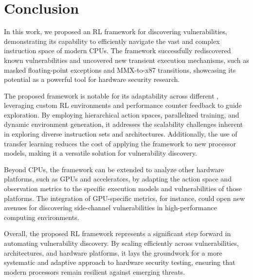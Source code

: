 \section{Conclusion}



In this work, we proposed an RL framework for discovering \Mi vulnerabilities, demonstrating its capability to efficiently navigate the vast and complex instruction space of modern CPUs. The framework successfully rediscovered known vulnerabilities and uncovered new transient execution mechanisms, such as masked floating-point exceptions and MMX-to-x87 transitions, showcasing its potential as a powerful tool for hardware security research.

The proposed framework is notable for its adaptability across different \Mi, leveraging custom RL environments and performance counter feedback to guide exploration. By employing hierarchical action spaces, parallelized training, and dynamic environment generation, it addresses the scalability challenges inherent in exploring diverse instruction sets and architectures. Additionally, the use of transfer learning reduces the cost of applying the framework to new processor models, making it a versatile solution for vulnerability discovery.

Beyond CPUs, the framework can be extended to analyze other hardware platforms, such as GPUs and accelerators, by adapting the action space and observation metrics to the specific execution models and vulnerabilities of those platforms. The integration of GPU-specific metrics, for instance, could open new avenues for discovering side-channel vulnerabilities in high-performance computing environments.


Overall, the proposed RL framework represents a significant step forward in automating \Mi vulnerability discovery. By scaling efficiently across vulnerabilities, architectures, and hardware platforms, it lays the groundwork for a more systematic and adaptive approach to hardware security testing, ensuring that modern processors remain resilient against emerging threats.
